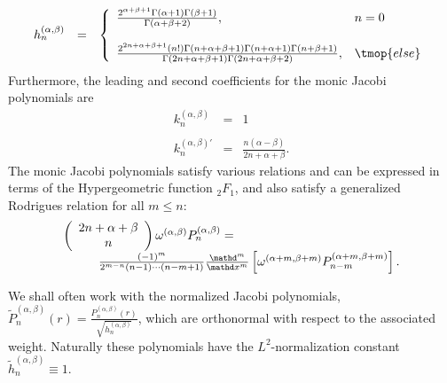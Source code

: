 \begin{equation}
  \label{eq:monic-h} \begin{array}{lll}
    h_n^{(\alpha, \beta)} & = & \left\{ \begin{array}{ll}
      \frac{2^{\alpha + \beta + 1} \Gamma (\alpha + 1) \Gamma (\beta +
      1)}{\Gamma (\alpha + \beta + 2)}, & n = 0\\
      & \\
      \frac{2^{2 n + \alpha + \beta + 1} (n!) \Gamma (n + \alpha + \beta + 1)
      \Gamma (n + \alpha + 1) \Gamma (n + \beta + 1)}{\Gamma (2 n + \alpha +
      \beta + 1) \Gamma (2 n + \alpha + \beta + 2)}, & \tmop{else}
    \end{array} \right.
  \end{array}
\end{equation}
Furthermore, the leading and second coefficients for the monic Jacobi
polynomials are
\[ \begin{array}{lll}
     k_n^{(\alpha, \beta)} & = & 1\\
     &  & \\
     k_n^{(\alpha, \beta)'} & = & \frac{n (\alpha - \beta)}{2 n + \alpha +
     \beta} .
   \end{array} \]
The monic Jacobi polynomials satisfy various relations and can be expressed in
terms of the Hypergeometric function $_2 F_1$, and also satisfy a generalized
Rodrigues relation for all $m \leq n$:
\begin{equation}
  \label{eq:rodrigues} \begin{array}{l}
    \left( \begin{array}{c}
      2 n + \alpha + \beta\\
      n
    \end{array} \right) \omega^{(\alpha, \beta)} P_n^{(\alpha, \beta)} =\\
    \hspace{1.0cm} \frac{(- 1)^m}{2^{m - n} (n - 1) \cdots (n - m + 1)}
    \frac{\mathd^m}{\mathd x^m} \left[ \omega^{(\alpha + m, \beta + m)} P_{n -
    m}^{(\alpha + m, \beta + m)} \right] .
  \end{array}
\end{equation}


We shall often work with the normalized Jacobi polynomials,
$\tilde{P}^{(\alpha, \beta)}_n (r) = \frac{P^{(\alpha, \beta)}_n
(r)}{\sqrt{h^{(\alpha, \beta)}_n}}$, which are orthonormal with respect to the
associated weight. Naturally these polynomials have the $L^2$-normalization
constant $\tilde{h}_n^{(\alpha, \beta)} \equiv 1$.



